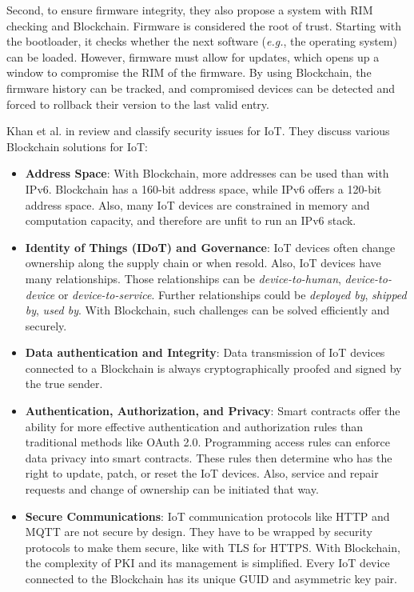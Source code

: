 Second, to ensure firmware integrity, they also propose a system with RIM checking and Blockchain.
Firmware is considered the root of trust. Starting with the bootloader, it checks whether the next software (\textit{e.g.}, the operating system) can be loaded.
However, firmware must allow for updates, which opens up a window to compromise the RIM of the firmware. By using Blockchain, the firmware history can be tracked, and compromised devices can be detected and forced to rollback their
version to the last valid entry.

Khan et al. in \cite{Khan2018} review and classify security issues for IoT. They discuss various Blockchain solutions for IoT:

\begin{itemize}
  \item {\textbf{Address Space}: With Blockchain, more addresses can be used than with IPv6. Blockchain has a 160-bit address space, while IPv6 offers a 120-bit address space.
  Also, many IoT devices are constrained in memory and computation capacity, and therefore are unfit to run an IPv6 stack.}
  \item {\textbf{Identity of Things (IDoT) and Governance}: IoT devices often change ownership along the supply chain or when resold. Also, IoT devices have many relationships. Those relationships can be \textit{device-to-human}, \textit{device-to-device} or \textit{device-to-service}. Further relationships could be \textit{deployed by}, \textit{shipped by}, \textit{used by}. With Blockchain, such challenges can be solved efficiently and securely.}
  \item {\textbf{Data authentication and Integrity}: Data transmission of IoT devices connected to a Blockchain is always cryptographically proofed and signed by the true sender.}
  \item {\textbf{Authentication, Authorization, and Privacy}: Smart contracts offer the ability for more effective authentication and authorization rules than traditional methods like OAuth 2.0. Programming access rules can enforce data privacy into smart contracts. These rules then determine who has the right to update, patch, or reset the IoT devices. Also, service and repair requests and change of ownership can be initiated that way. }
  \item {\textbf{Secure Communications}: IoT communication protocols like HTTP and MQTT are not secure by design. They have to be wrapped by security protocols to make them secure, like with TLS for HTTPS.
  With Blockchain, the complexity of PKI and its management is simplified. Every IoT device connected to the Blockchain has its unique GUID and asymmetric key pair. }
\end{itemize}


